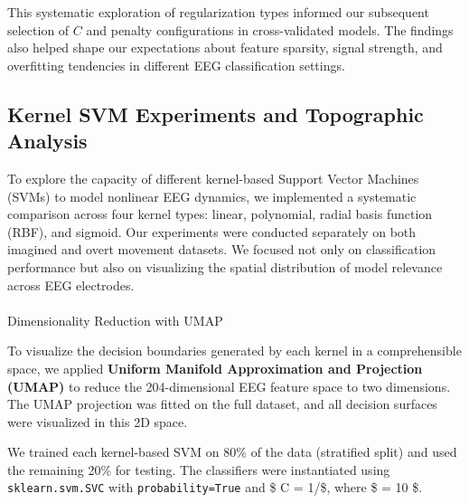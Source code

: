\documentclass[
  letterpaper,
  DIV=11,
  numbers=noendperiod]{scrartcl}
\makeatletter
\let\oldparagraph\paragraph
\renewcommand{\paragraph}{
    \@ifstar
      \xxxParagraphStar
      \xxxParagraphNoStar
  }
\newcommand{\xxxParagraphStar}[1]{\oldparagraph*{#1}\mbox{}}
\newcommand{\xxxParagraphNoStar}[1]{\oldparagraph{#1}\mbox{}}
\makeatother
\begin{document}
This systematic exploration of regularization types informed our
subsequent selection of \(C\) and penalty configurations in
cross-validated models. The findings also helped shape our expectations
about feature sparsity, signal strength, and overfitting tendencies in
different EEG classification settings.

\subsection{Kernel SVM Experiments and Topographic
Analysis}\label{kernel-svm-experiments-and-topographic-analysis}

To explore the capacity of different kernel-based Support Vector
Machines (SVMs) to model nonlinear EEG dynamics, we implemented a
systematic comparison across four kernel types: linear, polynomial,
radial basis function (RBF), and sigmoid. Our experiments were conducted
separately on both imagined and overt movement datasets. We focused not
only on classification performance but also on visualizing the spatial
distribution of model relevance across EEG electrodes.

\paragraph{Dimensionality Reduction with
UMAP}\label{dimensionality-reduction-with-umap}

To visualize the decision boundaries generated by each kernel in a
comprehensible space, we applied \textbf{Uniform Manifold Approximation
and Projection (UMAP)} to reduce the 204-dimensional EEG feature space
to two dimensions. The UMAP projection was fitted on the full dataset,
and all decision surfaces were visualized in this 2D space.

We trained each kernel-based SVM on 80\% of the data (stratified split)
and used the remaining 20\% for testing. The classifiers were
instantiated using \texttt{sklearn.svm.SVC} with
\texttt{probability=True} and \$ C = 1/\alpha \$, where \$ \alpha = 10
\$.
\end{document}
